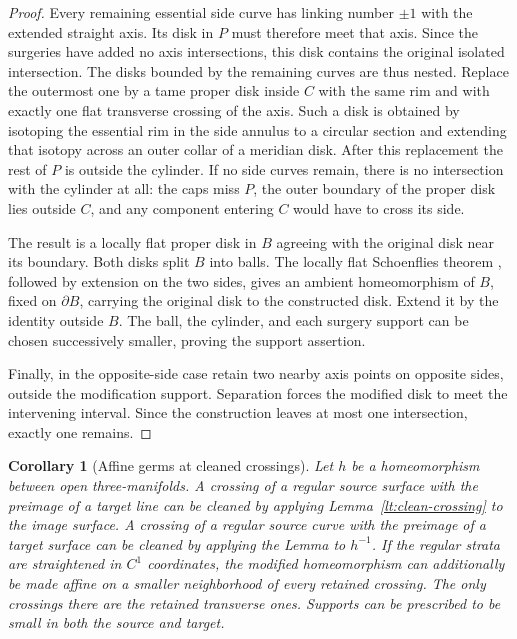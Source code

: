 \documentclass[11pt]{article}
\numberwithin{equation}{section}
\newtheorem{corollary}[theorem]{Corollary}
\theoremstyle{definition}
\theoremstyle{remark}
\begin{document}
\begin{proof}
Every remaining essential side curve has linking number $\pm1$ with
the extended straight axis.  Its disk in $P$ must therefore meet that
axis.  Since the surgeries have added no axis intersections, this disk
contains the original isolated intersection.  The disks bounded by the
remaining curves are thus nested.  Replace the outermost one by a tame
proper disk inside $C$ with the same rim and with exactly one flat
transverse crossing of the axis.  Such a disk is obtained by isotoping
the essential rim in the side annulus to a circular section and
extending that isotopy across an outer collar of a meridian disk.
After this replacement the rest of $P$ is outside the cylinder.  If no
side curves remain, there is no intersection with the cylinder at all:
the caps miss $P$, the outer boundary of the proper disk lies outside
$C$, and any component entering $C$ would have to cross its side.

The result is a locally flat proper disk in $B$ agreeing with the
original disk near its boundary.  Both disks split $B$ into balls.
The locally flat Schoenflies theorem \cite[Theorem~4]{Brown1962},
followed by extension on the two
sides, gives an ambient homeomorphism of $B$, fixed on $\partial B$,
carrying the original disk to the constructed disk.  Extend it by the
identity outside $B$.  The ball, the cylinder, and each surgery support
can be chosen successively smaller, proving the support assertion.

Finally, in the opposite-side case retain two nearby axis points on
opposite sides, outside the modification support.  Separation forces
the modified disk to meet the intervening interval.  Since the
construction leaves at most one intersection, exactly one remains.
\end{proof}

\begin{corollary}[Affine germs at cleaned crossings]
\label{lt:affine-crossing}
Let $h$ be a homeomorphism between open three-manifolds.  A crossing of
a regular source surface with the preimage of a target line can be
cleaned by applying Lemma~\ref{lt:clean-crossing} to the image surface.
A crossing of a regular source curve with the preimage of a target
surface can be cleaned by applying the Lemma to $h^{-1}$.
If the regular strata are straightened in $C^1$ coordinates, the
modified homeomorphism can additionally be made affine on a smaller
neighborhood of every retained crossing.  The only crossings there
are the retained transverse ones.  Supports can be prescribed to be
small in both the source and target.
\end{corollary}
\end{document}
